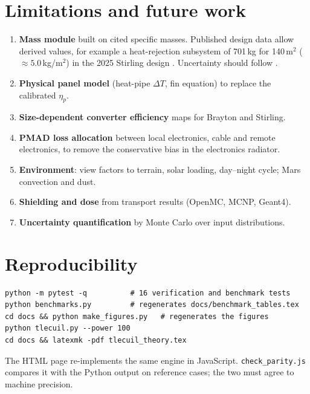 \documentclass[11pt]{article}
\numberwithin{equation}{section}
\numberwithin{table}{section}
\begin{document}
\section{Limitations and future work}\label{sec:limits}
\begin{enumerate}
  \item \textbf{Mass module} built on cited specific masses. Published design data
        allow derived values, for example a heat-rejection subsystem of 701\,kg for
        140\,m$^2$ ($\approx5.0$\,kg/m$^2$) in the 2025 Stirling design
        \cite{mason2025trades}. Uncertainty should follow
        \cite{charoenboonvivat2025uq}.
  \item \textbf{Physical panel model} (heat-pipe $\Delta T$, fin equation) to replace
        the calibrated $\eta_p$.
  \item \textbf{Size-dependent converter efficiency} maps for Brayton and Stirling.
  \item \textbf{PMAD loss allocation} between local electronics, cable and remote
        electronics, to remove the conservative bias in the electronics radiator.
  \item \textbf{Environment}: view factors to terrain, solar loading, day--night
        cycle; Mars convection and dust.
  \item \textbf{Shielding and dose} from transport results (OpenMC, MCNP, Geant4).
  \item \textbf{Uncertainty quantification} by Monte Carlo over input distributions.
\end{enumerate}

\section{Reproducibility}
\begin{verbatim}
python -m pytest -q          # 16 verification and benchmark tests
python benchmarks.py         # regenerates docs/benchmark_tables.tex
cd docs && python make_figures.py   # regenerates the figures
python tlecuil.py --power 100
cd docs && latexmk -pdf tlecuil_theory.tex
\end{verbatim}
The HTML page re-implements the same engine in JavaScript.
\texttt{check\_parity.js} compares it with the Python output on reference cases;
the two must agree to machine precision.
\end{document}
